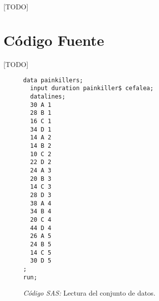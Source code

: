 \documentclass[11pt]{article}
\begin{document}
      \paragraph{}
      [TODO]


  \section{Código Fuente}

    \paragraph{}
    [TODO]

    \begin{figure}[!h]
      \centering
      \begin{verbatim}
data painkillers;
  input duration painkiller$ cefalea;
  datalines;
  30 A 1
  28 B 1
  16 C 1
  34 D 1
  14 A 2
  14 B 2
  10 C 2
  22 D 2
  24 A 3
  20 B 3
  14 C 3
  28 D 3
  38 A 4
  34 B 4
  20 C 4
  44 D 4
  26 A 5
  24 B 5
  14 C 5
  30 D 5
;
run;
      \end{verbatim}
      \caption{\emph{Código SAS:} Lectura del conjunto de datos.}
      \label{code:sas_1}
    \end{figure}



  \nocite{rano2017}
  \nocite{sas}

  
  
\end{document}
